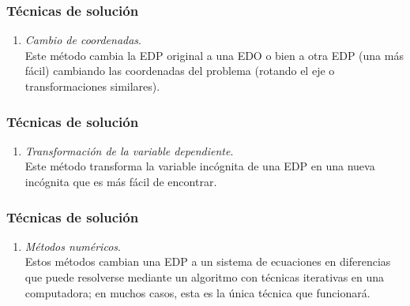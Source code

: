 \documentclass[12pt]{beamer}
\begin{document}
\begin{frame}
\frametitle{Técnicas de solución}
\begin{enumerate}
\conti
\item \emph{Cambio de coordenadas}.
\\
\bigskip
Este método cambia la EDP original a una EDO o bien a otra EDP (una más fácil) cambiando las coordenadas del problema (rotando el eje o transformaciones similares).
\seti
\end{enumerate}
\end{frame}
\begin{frame}
\frametitle{Técnicas de solución}
\begin{enumerate}
\conti
\item \emph{Transformación de la variable dependiente}.
\\
\bigskip
Este método transforma la variable incógnita de una EDP en una nueva incógnita que es más fácil de encontrar.
\seti
\end{enumerate}
\end{frame}
\begin{frame}
\frametitle{Técnicas de solución}
\begin{enumerate}
\conti
\item \emph{Métodos numéricos}. 
\\
\bigskip
Estos métodos cambian una EDP a un sistema de ecuaciones en diferencias que puede resolverse mediante un algoritmo con técnicas iterativas en una computadora; en muchos casos, esta es la única técnica que funcionará. 
\seti
\end{enumerate}
\end{frame}
\end{document}
